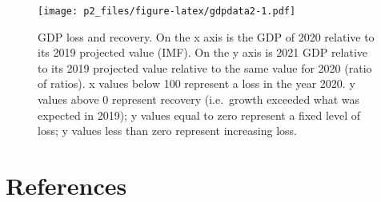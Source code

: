\documentclass[
]{article}
\begin{document}
\begin{figure}
\centering
\texttt{[image: p2\_files/figure-latex/gdpdata2-1.pdf]}
\caption{\label{fig:gdpdata2}GDP loss and recovery. On the x axis is the GDP of 2020 relative to its 2019 projected value (IMF). On the y axis is 2021 GDP relative to its 2019 projected value relative to the same value for 2020 (ratio of ratios). x values below 100 represent a loss in the year 2020. y values above 0 represent recovery (i.e.~growth exceeded what was expected in 2019); y values equal to zero represent a fixed level of loss; y values less than zero represent increasing loss.}
\end{figure}

\newpage

\hypertarget{references}{%
\section{References}\label{references}}
\end{document}

